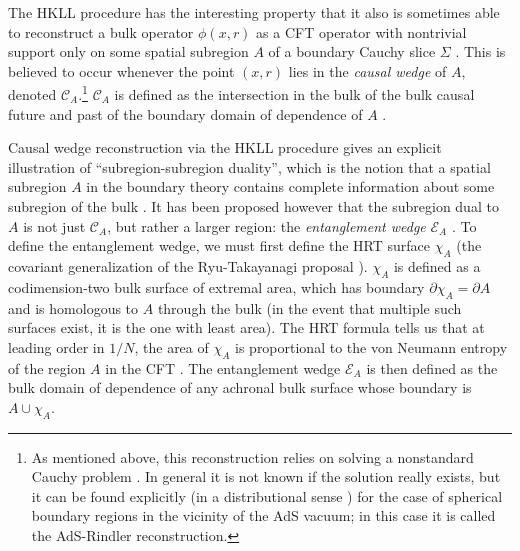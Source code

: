 \documentclass[aps,nofootinbib,longbibliography,superscriptaddress,12pt]{revtex4-1}
\newcommand{\CA}{\mathcal{C}_A}
\newcommand{\EA}{\mathcal{E}_A}
\begin{document}
The HKLL procedure has the interesting property that it also is sometimes able to reconstruct a bulk operator $\phi(x,r)$ as a CFT operator with nontrivial support only on some spatial subregion $A$ of a boundary Cauchy slice $\Sigma$ \cite{Hamilton:2006az,Morrison:2014jha}.  This is believed to occur whenever the point $(x,r)$ lies in the \textit{causal wedge} of $A$, denoted $\CA$.\footnote{As mentioned above, this reconstruction relies on solving a nonstandard Cauchy problem \cite{Bousso:2012mh,Heemskerk:2012mn}.  In general it is not known if the solution really exists, but it can be found explicitly (in a distributional sense \cite{Morrison:2014jha}) for the case of spherical boundary regions in the vicinity of the AdS vacuum; in this case it is called the AdS-Rindler reconstruction.}  $\CA$ is defined as the intersection in the bulk of the bulk causal future and past of the boundary domain of dependence of $A$ \cite{Hubeny:2012wa}.

Causal wedge reconstruction via the HKLL procedure gives an explicit illustration of ``subregion-subregion duality'', which is the notion that a spatial subregion $A$ in the boundary theory contains complete information about some subregion of the bulk \cite{Bousso:2012sj,Czech:2012bh,Bousso:2012mh}.  It has been proposed however that the subregion dual to $A$ is not just $\mathcal{C}_A$, but rather a larger region: the \textit{entanglement wedge} $\EA$ \cite{Czech:2012bh,Wall:2012uf,Headrick:2014cta}.  To define the entanglement wedge, we must first define the HRT surface $\chi_A$ \cite{Hubeny:2007xt} (the covariant generalization of the Ryu-Takayanagi proposal \cite{Ryu:2006bv}).  $\chi_A$ is defined as a codimension-two bulk surface of extremal area, which has boundary $\partial \chi_A=\partial A$ and is homologous to $A$ through the bulk (in the event that multiple such surfaces exist, it is the one with least area).  The HRT formula tells us that at leading order in $1/N$, the area of $\chi_A$ is proportional to the von Neumann entropy of the region $A$ in the CFT \cite{Ryu:2006bv,Hubeny:2007xt,Lewkowycz:2013nqa}.  The entanglement wedge $\EA$ is then defined as the bulk domain of dependence of any achronal bulk surface whose boundary is $A \cup \chi_A$.
\end{document}
